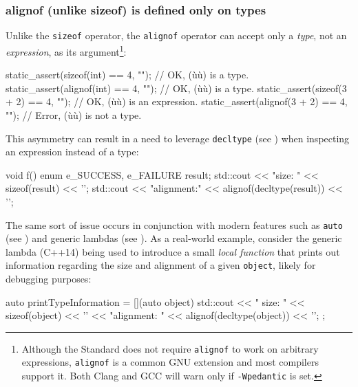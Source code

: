\subsubsection[\lstinline!alignof! (unlike \lstinline!sizeof!) is defined only on types]{{\SubsubsecCode alignof} (unlike {\SubsubsecCode sizeof}) is defined only on types}\label{alignof-(unlike-sizeof)-is-defined-only-on-types}

Unlike the \lstinline!sizeof! operator, the \lstinline!alignof! operator can accept only a \emph{type}, not an \emph{expression}, as its argument{\cprotect\footnote{Although
the Standard does not require \lstinline!alignof! to work on arbitrary
expressions, \lstinline!alignof! is a common GNU extension and most compilers support
  it. Both Clang and GCC will warn only if \lstinline!-Wpedantic! is set.}}:

\begin{emcppslisting}
static_assert(sizeof(int)  == 4, "");     // OK, (ù{}ù) is a type.
static_assert(alignof(int) == 4, "");     // OK, (ù{}ù) is a type.
static_assert(sizeof(3 + 2) == 4, "");    // OK, (ù{}ù) is an expression.
static_assert(alignof(3 + 2) == 4, "");   // Error, (ù{}ù) is not a type.
\end{emcppslisting}

\noindent This asymmetry can result in a need to leverage
\lstinline!decltype! (see ) when inspecting an expression instead
of a type:

\begin{emcppslisting}
void f()
{
    enum { e_SUCCESS, e_FAILURE } result;
    std::cout << "size: " << sizeof(result) << '\n';
    std::cout << "alignment:" << alignof(decltype(result)) << '\n';
}
\end{emcppslisting}

\noindent The same sort of issue occurs in conjunction with modern  features such as \lstinline!auto! (see ) and
generic lambdas (see ). As a real-world example, consider the
generic lambda (C++14) being used to introduce a small
\emph{local function} that prints out information regarding the size and
alignment of a given \lstinline!object!, likely for debugging purposes:

\begin{emcppslisting}
auto printTypeInformation = [](auto object)
{
    std::cout << "     size: " << sizeof(object) << '\n'
              << "alignment: " << alignof(decltype(object)) << '\n';
};
\end{emcppslisting}

